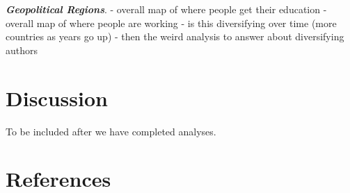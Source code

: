 \documentclass[
  english,
  man]{apa6}
\newlength{\cslhangindent}
\newlength{\cslentryspacingunit} %
\newenvironment{CSLReferences}[2] %
 {%
  \setlength{\parindent}{0pt}
  \ifodd #1
  \let\oldpar\par
  \def\par{\hangindent=\cslhangindent\oldpar}
  \fi
  \setlength{\parskip}{#2\cslentryspacingunit}
 }%
 {}
\begin{document}
\textbf{\emph{Geopolitical Regions}}.
- overall map of where people get their education
- overall map of where people are working
- is this diversifying over time (more countries as years go up)
- then the weird analysis to answer about diversifying authors

\hypertarget{discussion}{%
\section{Discussion}\label{discussion}}

To be included after we have completed analyses.

\newpage

\hypertarget{references}{%
\section{References}\label{references}}

\begingroup
\setlength{\parindent}{-0.5in}
\setlength{\leftskip}{0.5in}

\hypertarget{refs}{}
\begin{CSLReferences}{0}{0}
\end{CSLReferences}

\endgroup
\end{document}
